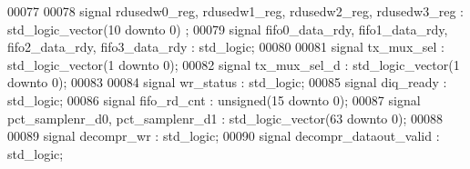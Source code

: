 \begin{DoxyCode}
00077   
00078   \textcolor{keywordflow}{signal} \textcolor{vhdlchar}{rdusedw0_reg}\textcolor{vhdlchar}{,} \textcolor{vhdlchar}{rdusedw1_reg}\textcolor{vhdlchar}{,} \textcolor{vhdlchar}{rdusedw2_reg}\textcolor{vhdlchar}{,} \textcolor{vhdlchar}{rdusedw3_reg}             \textcolor{vhdlchar}{:} \textcolor{comment}{std\_logic\_vector}\textcolor{vhdlchar}{(}\textcolor{vhdllogic}{}\textcolor{vhdllogic}{10} \textcolor{keywordflow}{downto} \textcolor{vhdllogic}{}\textcolor{vhdllogic}{0}\textcolor{vhdlchar}{)}
      ;
00079   \textcolor{keywordflow}{signal} \textcolor{vhdlchar}{fifo0_data_rdy}\textcolor{vhdlchar}{,} \textcolor{vhdlchar}{fifo1_data_rdy}\textcolor{vhdlchar}{,} \textcolor{vhdlchar}{fifo2_data_rdy}\textcolor{vhdlchar}{,} \textcolor{vhdlchar}{fifo3_data_rdy} \textcolor{vhdlchar}{:} \textcolor{comment}{std\_logic};
00080   
00081   \textcolor{keywordflow}{signal} \textcolor{vhdlchar}{tx_mux_sel}     \textcolor{vhdlchar}{:} \textcolor{comment}{std\_logic\_vector}\textcolor{vhdlchar}{(}\textcolor{vhdllogic}{}\textcolor{vhdllogic}{1} \textcolor{keywordflow}{downto} \textcolor{vhdllogic}{}\textcolor{vhdllogic}{0}\textcolor{vhdlchar}{)};
00082   \textcolor{keywordflow}{signal} \textcolor{vhdlchar}{tx_mux_sel_d}   \textcolor{vhdlchar}{:} \textcolor{comment}{std\_logic\_vector}\textcolor{vhdlchar}{(}\textcolor{vhdllogic}{}\textcolor{vhdllogic}{1} \textcolor{keywordflow}{downto} \textcolor{vhdllogic}{}\textcolor{vhdllogic}{0}\textcolor{vhdlchar}{)}; 
00083   
00084   \textcolor{keywordflow}{signal} \textcolor{vhdlchar}{wr_status}      \textcolor{vhdlchar}{:} \textcolor{comment}{std\_logic};
00085   \textcolor{keywordflow}{signal} \textcolor{vhdlchar}{diq_ready}          \textcolor{vhdlchar}{:} \textcolor{comment}{std\_logic};
00086   \textcolor{keywordflow}{signal} \textcolor{vhdlchar}{fifo_rd_cnt}    \textcolor{vhdlchar}{:} \textcolor{comment}{unsigned}\textcolor{vhdlchar}{(}\textcolor{vhdllogic}{}\textcolor{vhdllogic}{15} \textcolor{keywordflow}{downto} \textcolor{vhdllogic}{}\textcolor{vhdllogic}{0}\textcolor{vhdlchar}{)};
00087   \textcolor{keywordflow}{signal} \textcolor{vhdlchar}{pct_samplenr_d0}\textcolor{vhdlchar}{,}  \textcolor{vhdlchar}{pct_samplenr_d1} \textcolor{vhdlchar}{:} \textcolor{comment}{std\_logic\_vector}\textcolor{vhdlchar}{(}\textcolor{vhdllogic}{}\textcolor{vhdllogic}{63} \textcolor{keywordflow}{downto} \textcolor{vhdllogic}{}\textcolor{vhdllogic}{0}\textcolor{vhdlchar}{)};
00088   
00089   \textcolor{keywordflow}{signal} \textcolor{vhdlchar}{decompr_wr}                     \textcolor{vhdlchar}{:} \textcolor{comment}{std\_logic};
00090   \textcolor{keywordflow}{signal} \textcolor{vhdlchar}{decompr_dataout_valid}  \textcolor{vhdlchar}{:} \textcolor{comment}{std\_logic};

\end{DoxyCode}
